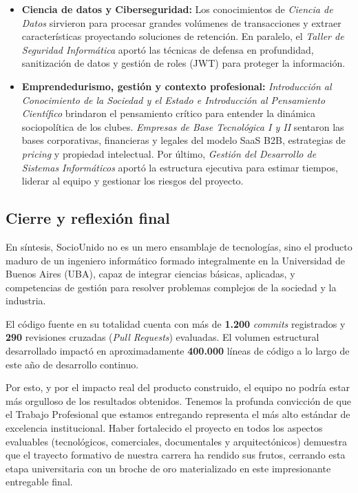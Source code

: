 \begin{itemize}
    \item \textbf{Ciencia de datos y Ciberseguridad:} Los conocimientos de \textit{Ciencia de Datos} sirvieron para procesar grandes volúmenes de transacciones y extraer características proyectando soluciones de retención. En paralelo, el \textit{Taller de Seguridad Informática} aportó las técnicas de defensa en profundidad, sanitización de datos y gestión de roles (JWT) para proteger la información.

    \item \textbf{Emprendedurismo, gestión y contexto profesional:} \textit{Introducción al Conocimiento de la Sociedad y el Estado e Introducción al Pensamiento Científico} brindaron el pensamiento crítico para entender la dinámica sociopolítica de los clubes. \textit{Empresas de Base Tecnológica I y II} sentaron las bases corporativas, financieras y legales del modelo SaaS B2B, estrategias de \textit{pricing} y propiedad intelectual. Por último, \textit{Gestión del Desarrollo de Sistemas Informáticos} aportó la estructura ejecutiva para estimar tiempos, liderar al equipo y gestionar los riesgos del proyecto.
\end{itemize}

\subsection{Cierre y reflexión final}

En síntesis, SocioUnido no es un mero ensamblaje de tecnologías, sino el producto maduro de un ingeniero informático formado integralmente en la Universidad de Buenos Aires (UBA), capaz de integrar ciencias básicas, aplicadas, y competencias de gestión para resolver problemas complejos de la sociedad y la industria.

El código fuente en su totalidad cuenta con más de \textbf{1.200} \textit{commits} registrados y \textbf{290} revisiones cruzadas (\textit{Pull Requests}) evaluadas. El volumen estructural desarrollado impactó en aproximadamente \textbf{400.000} líneas de código a lo largo de este año de desarrollo continuo.

Por esto, y por el impacto real del producto construido, el equipo no podría estar más orgulloso de los resultados obtenidos. Tenemos la profunda convicción de que el Trabajo Profesional que estamos entregando representa el más alto estándar de excelencia institucional. Haber fortalecido el proyecto en todos los aspectos evaluables (tecnológicos, comerciales, documentales y arquitectónicos) demuestra que el trayecto formativo de nuestra carrera ha rendido sus frutos, cerrando esta etapa universitaria con un broche de oro materializado en este impresionante entregable final.
